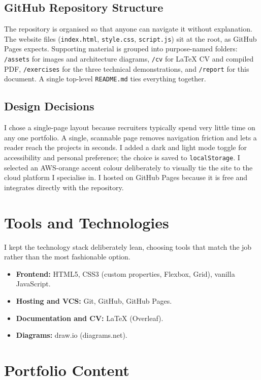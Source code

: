 \documentclass[11pt,a4paper]{article}
\begin{document}
\subsection{GitHub Repository Structure}
The repository is organised so that anyone can navigate it without explanation. The website files (\texttt{index.html}, \texttt{style.css}, \texttt{script.js}) sit at the root, as GitHub Pages expects. Supporting material is grouped into purpose-named folders: \texttt{/assets} for images and architecture diagrams, \texttt{/cv} for LaTeX CV and compiled PDF, \texttt{/exercises} for the three technical demonstrations, and \texttt{/report} for this document. A single top-level \texttt{README.md} ties everything together.

\subsection{Design Decisions}
I chose a single-page layout because recruiters typically spend very little time on any one portfolio. A single, scannable page removes navigation friction and lets a reader reach the projects in seconds. I added a dark and light mode toggle for accessibility and personal preference; the choice is saved to \texttt{localStorage}. I selected an AWS-orange accent colour deliberately to visually tie the site to the cloud platform I specialise in. I hosted on GitHub Pages because it is free and integrates directly with the repository.

\section{Tools and Technologies}
I kept the technology stack deliberately lean, choosing tools that match the job rather than the most fashionable option.

\begin{itemize}[leftmargin=*]
  \item \textbf{Frontend:} HTML5, CSS3 (custom properties, Flexbox, Grid), vanilla JavaScript.
  \item \textbf{Hosting and VCS:} Git, GitHub, GitHub Pages.
  \item \textbf{Documentation and CV:} LaTeX (Overleaf).
  \item \textbf{Diagrams:} draw.io (diagrams.net).
\end{itemize}

\section{Portfolio Content}
\end{document}
